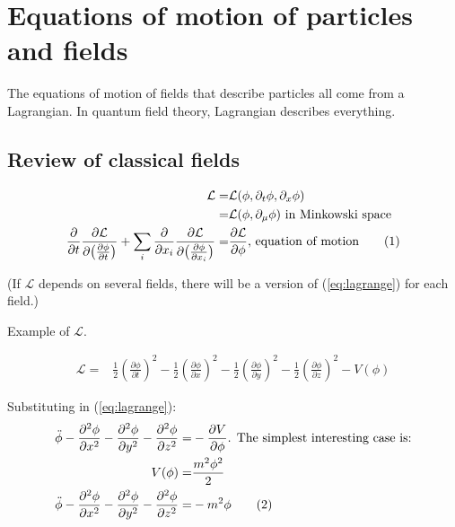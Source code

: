 \documentclass[]{article}
\newcommand\numberthis{\addtocounter{equation}{1}\tag{\theequation}}
\begin{document}
\section{Equations of motion of particles and fields}\label{sect:equation:motion}

The equations of motion of fields that describe  particles all come from a Lagrangian. In quantum field theory, Lagrangian describes everything.

\subsection{Review of classical fields}

\begin{align*}
\mathcal{L}=& \mathcal{L}(\phi,\partial_t \phi, \partial_x \phi)\\
=&\mathcal{L}(\phi,\partial_{\mu} \phi) \text{ in Minkowski space}\\
\frac{\partial}{\partial t} \frac{\partial \mathcal{L}}{\partial \big(\frac{\partial \phi}{\partial t}\big)}+\sum_i \frac{\partial}{\partial x_i} \frac{\partial \mathcal{L}}{\partial \big(\frac{\partial \phi}{\partial x_i}\big)}=&\frac{\partial \mathcal{L}}{\partial \phi} \text{, equation of motion} \numberthis \label{eq:lagrange}
\end{align*}

(If $\mathcal{L}$ depends on several fields, there will be a version of (\ref{eq:lagrange})  for each field.)

Example of $\mathcal{L}$.

\begin{align*}
	\mathcal{L} =& \frac{1}{2} (\frac{\partial \phi}{\partial t})^2 - \frac{1}{2} (\frac{\partial \phi}{\partial x})^2 - \frac{1}{2} (\frac{\partial \phi}{\partial y})^2 - \frac{1}{2} (\frac{\partial \phi}{\partial z})^2 - V(\phi)
\end{align*}

Substituting in (\ref{eq:lagrange}):
\begin{align*}
	\ddot{\phi} - \frac{\partial^2 \phi}{\partial x^2}  - \frac{\partial^2 \phi}{\partial y^2}  - \frac{\partial^2 \phi}{\partial z^2} =& - \frac{\partial V}{\partial \phi} \text{. The simplest interesting case is:}\\
	V(\phi) =& \frac{m^2 \phi^2}{2}\\
	\ddot{\phi} - \frac{\partial^2 \phi}{\partial x^2}  - \frac{\partial^2 \phi}{\partial y^2}  - \frac{\partial^2 \phi}{\partial z^2} =& - m^2 \phi \numberthis \label{eq:simplest:non:trivial}
\end{align*}
\end{document}
